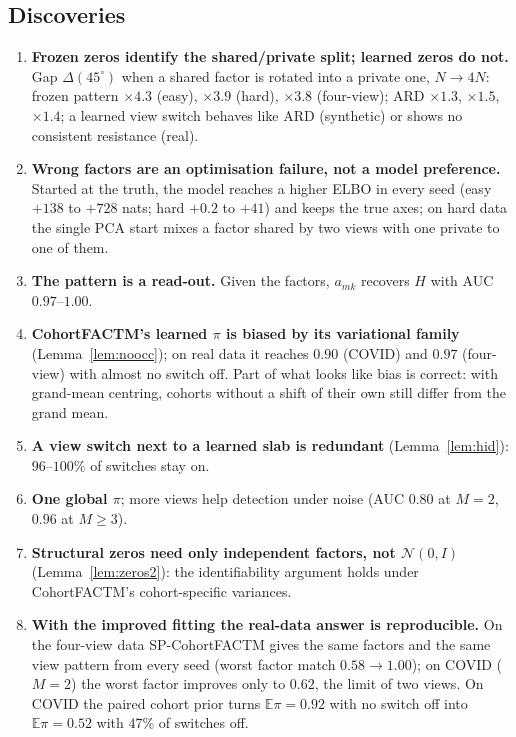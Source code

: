 \documentclass[11pt,a4paper]{article}
\newcommand{\E}{\mathbb{E}}
\newcommand{\N}{\mathcal{N}}
\theoremstyle{definition}
\theoremstyle{remark}
\begin{document}
\subsection{Discoveries}
\begin{enumerate}[itemsep=3pt]
\item \textbf{Frozen zeros identify the shared/private split; learned zeros do not.} Gap $\Delta(45^\circ)$ when a shared factor
  is rotated into a private one, $N\to4N$: frozen pattern $\times4.3$ (easy), $\times3.9$ (hard), $\times3.8$ (four-view);
  ARD $\times1.3$, $\times1.5$, $\times1.4$; a learned view switch behaves like ARD (synthetic) or shows no consistent
  resistance (real).
\item \textbf{Wrong factors are an optimisation failure, not a model preference.} Started at the truth, the model reaches a
  higher ELBO in every seed (easy $+138$ to $+728$ nats; hard $+0.2$ to $+41$) and keeps the true axes; on hard data the
  single PCA start mixes a factor shared by two views with one private to one of them.
\item \textbf{The pattern is a read-out.} Given the factors, $a_{mk}$ recovers $H$ with AUC $0.97$--$1.00$.
\item \textbf{CohortFACTM's learned $\pi$ is biased by its variational family} (Lemma~\ref{lem:noocc}); on real data it reaches
  $0.90$ (COVID) and $0.97$ (four-view) with almost no switch off. Part of what looks like bias is correct: with
  grand-mean centring, cohorts without a shift of their own still differ from the grand mean.
\item \textbf{A view switch next to a learned slab is redundant} (Lemma~\ref{lem:hid}): $96$--$100\%$ of switches stay on.
\item \textbf{One global $\pi$}; more views help detection under noise (AUC $0.80$ at $M=2$, $0.96$ at $M\ge3$).
\item \textbf{Structural zeros need only independent factors, not $\N(0,I)$} (Lemma~\ref{lem:zeros2}): the identifiability
  argument holds under CohortFACTM's cohort-specific variances.
\item \textbf{With the improved fitting the real-data answer is reproducible.} On the four-view data SP-CohortFACTM gives
  the same factors and the same view pattern from every seed (worst factor match $0.58\to1.00$); on COVID ($M=2$) the
  worst factor improves only to $0.62$, the limit of two views. On COVID the paired cohort prior turns $\E\pi=0.92$
  with no switch off into $\E\pi=0.52$ with $47\%$ of switches off.
\end{enumerate}
\end{document}
